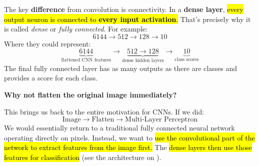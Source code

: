 \highspace
The key \textbf{difference} from convolution is connectivity. In a \textbf{dense layer}, \hl{every output neuron is connected to \textbf{every input activation}.} That's precisely why it is called \emph{dense} or \emph{fully connected}. For example:
\begin{equation*}
    6144 \to 512 \to 128 \to 10
\end{equation*}
Where they could represent:
\begin{equation*}
    \underbrace{6144}_{\text{flattened CNN features}} \to \underbrace{512 \to 128}_{\text{dense hidden layers}} \to \underbrace{10}_{\text{class scores}}
\end{equation*}
The final fully connected layer has as many outputs as there are classes and provides a score for each class.

\highspace
\begin{flushleft}
    \textcolor{Green3}{ \textbf{Why not flatten the original image immediately?}}
\end{flushleft}
This brings us back to the entire motivation for CNNs. If we did:
\begin{equation*}
    \text{Image} \to \text{Flatten} \to \text{Multi-Layer Perceptron}
\end{equation*}
We would essentially return to a traditional fully connected neural network operating directly on pixels. Instead, we want to \hl{use the convolutional part of the network to extract features from the image first.} The \hl{dense layers then use those features for classification} (see the architecture on ).


